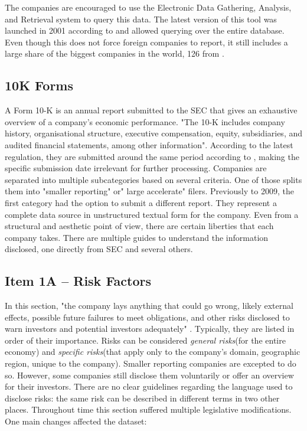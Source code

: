 \documentclass[12pt,MSc,a4paper,oneside]{muthesis}
\begin{document}
The companies are encouraged to use the Electronic Data Gathering, Analysis, and Retrieval system \cite{edgar-search} to query this data. The latest version of this tool was launched in 2001 according to \cite{edgar-search} and allowed querying over the entire database. Even though this does not force foreign companies to report, it still includes a large share of the biggest companies in the world, 126 from \cite{fortune-500-2021}.

\subsection{10K Forms}

A Form 10-K is an annual report submitted to the SEC that gives an exhaustive overview of a company's economic performance. "The 10-K includes company history, organisational structure, executive compensation, equity, subsidiaries, and audited financial statements, among other information"\cite{wiki:10k}. According to the latest regulation, they are submitted around the same period according to \cite{10k-general-rules}, making the specific submission date irrelevant for further processing. Companies are separated into multiple subcategories based on several criteria. One of those splits them into "smaller reporting" or" large accelerate" filers. Previously to 2009, the first category had the option to submit a different report. They represent a complete data source in unstructured textual form for the company. Even from a structural and aesthetic point of view, there are certain liberties that each company takes. There are multiple guides to understand the information disclosed, one directly from SEC and several others.

\subsection{Item 1A – Risk Factors}

In this section, "the company lays anything that could go wrong, likely external effects, possible future failures to meet obligations, and other risks disclosed to warn investors and potential investors adequately" \cite{wiki:10k}. Typically, they are listed in order of their importance. Risks can be considered \textit{general risks}(for the entire economy) and \textit{specific risks}(that apply only to the company's domain, geographic region, unique to the company). Smaller reporting companies are excepted to do so. However, some companies still disclose them voluntarily or offer an overview for their investors. There are no clear guidelines regarding the language used to disclose risks: the same risk can be described in different terms in two other places.
Throughout time this section suffered multiple legislative modifications. One main changes affected the dataset:
\end{document}
